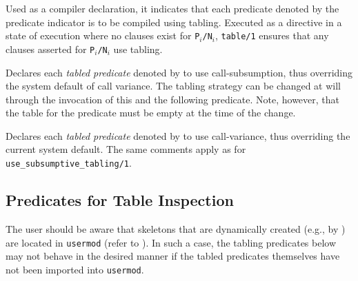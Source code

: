 \begin{description}

%
Used as a compiler declaration, it indicates that each predicate
denoted by the predicate indicator  is to be
compiled using tabling.  Executed as a directive in a state of
execution where no clauses exist for {\tt P$_i$/N$_i$}, {\tt table/1}
ensures that any clauses asserted for {\tt P$_i$/N$_i$} use tabling.


%
Declares each \emph{tabled predicate} denoted by 
to use call-subsumption, thus overriding the system default of call
variance.  The tabling strategy can be changed at will through the
invocation of this and the following predicate.  Note, however, that
the table for the predicate must be empty at the time of the change.


%
Declares each \emph{tabled predicate} denoted by 
to use call-variance, thus overriding the current system default.  The
same comments apply as for {\tt use\_subsumptive\_tabling/1}.

\end{description}


\subsection{Predicates for Table Inspection}
\label{sec:TablePred:Inspection}

The user should be aware that skeletons that are dynamically created
(e.g., by ) are located in {\tt usermod} (refer to
).  In such a case, the tabling predicates below may
not behave in the desired manner if the tabled predicates themselves
have not been imported into {\tt usermod}.

